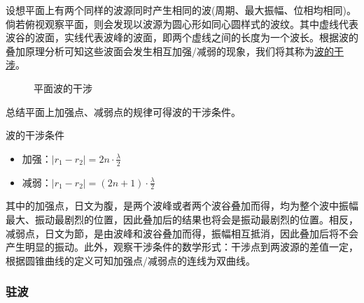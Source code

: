 设想平面上有两个同样的波源同时产生相同的波(周期、最大振幅、位相均相同)。倘若俯视观察平面，则会发现以波源为圆心形如同心圆样式的波纹。其中虚线代表波谷的波面，实线代表波峰的波面，即两个虚线之间的长度为一个波长。根据波的叠加原理分析可知这些波面会发生相互加强/减弱的现象，我们将其称为\underline{波的干涉}。
\begin{figure}[ht!]
    \centering
    \caption{平面波的干涉}
\end{figure}
总结平面上加强点、减弱点的规律可得波的干涉条件。
\begin{itembox}[l]{波的干涉条件}
    \begin{itemize}
        \item 加强：$|r_1-r_2|=2n\cdot\frac{\lambda}{2}$
        \item 减弱：$|r_1-r_2|=(2n+1)\cdot\frac{\lambda}{2}$
    \end{itemize}
\end{itembox}
其中的加强点，日文为腹，是两个波峰或者两个波谷叠加而得，均为整个波中振幅最大、振动最剧烈的位置，因此叠加后的结果也将会是振动最剧烈的位置。相反，减弱点，日文为節，是由波峰和波谷叠加而得，振幅相互抵消，因此叠加后将不会产生明显的振动。此外，观察干涉条件的数学形式：干涉点到两波源的差值一定，根据圆锥曲线的定义可知加强点/减弱点的连线为双曲线。

\subsubsection{驻波}


